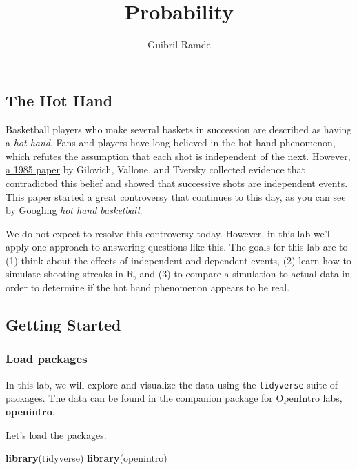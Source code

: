 \documentclass[
]{article}
\title{Probability}
\author{Guibril Ramde}
\date{}
\newenvironment{Shaded}{\begin{snugshade}}{\end{snugshade}}
\newcommand{\FunctionTok}[1]{\textcolor[rgb]{0.13,0.29,0.53}{\textbf{#1}}}
\newcommand{\NormalTok}[1]{#1}
\begin{document}
\maketitle

\subsection{The Hot Hand}\label{the-hot-hand}

Basketball players who make several baskets in succession are described
as having a \emph{hot hand}. Fans and players have long believed in the
hot hand phenomenon, which refutes the assumption that each shot is
independent of the next. However,
\href{http://www.sciencedirect.com/science/article/pii/0010028585900106}{a
1985 paper} by Gilovich, Vallone, and Tversky collected evidence that
contradicted this belief and showed that successive shots are
independent events. This paper started a great controversy that
continues to this day, as you can see by Googling \emph{hot hand
basketball}.

We do not expect to resolve this controversy today. However, in this lab
we'll apply one approach to answering questions like this. The goals for
this lab are to (1) think about the effects of independent and dependent
events, (2) learn how to simulate shooting streaks in R, and (3) to
compare a simulation to actual data in order to determine if the hot
hand phenomenon appears to be real.

\subsection{Getting Started}\label{getting-started}

\subsubsection{Load packages}\label{load-packages}

In this lab, we will explore and visualize the data using the
\texttt{tidyverse} suite of packages. The data can be found in the
companion package for OpenIntro labs, \textbf{openintro}.

Let's load the packages.

\begin{Shaded}
\begin{Highlighting}[]
\FunctionTok{library}\NormalTok{(tidyverse)}
\FunctionTok{library}\NormalTok{(openintro)}
\end{Highlighting}
\end{Shaded}
\end{document}
